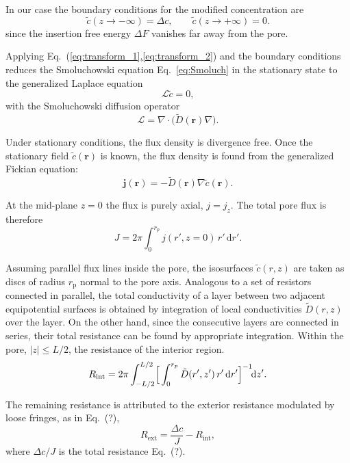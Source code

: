 \documentclass[12pt, a4paper]{article}
\begin{document}
In our case the boundary conditions for the modified concentration are 
\begin{equation*}
  \tilde c(z\to-\infty)=\Delta c,\qquad
  \tilde c(z\to+\infty)=0.
\end{equation*}
since the insertion free energy $\Delta F$ vanishes far away from the pore.

Applying Eq.~(\ref{eq:transform_1},\ref{eq:transform_2}) and the boundary conditions reduces the Smoluchowski equation Eq.~\eqref{eq:Smoluch} in the stationary state to the generalized Laplace equation
\begin{equation}
  \mathcal L\tilde c=0,
  \label{eq:laplace}
\end{equation}
with the Smoluchowski diffusion operator
\begin{equation*}
  \mathcal L=\nabla\!\cdot\!\bigl(\tilde D(\bm r)\nabla\bigr).
\end{equation*}

Under stationary conditions, the flux density is divergence free. 
Once the stationary field $\tilde c(\bm r)$ is known, the flux density is found from the generalized Fickian equation:
\begin{equation}
  \bm j(\bm r)=-\tilde D(\bm r)\nabla\tilde c(\bm r).
\end{equation}

At the mid-plane $z=0$ the flux is purely axial, $j=j_z$. The total pore flux is therefore
\begin{equation}
  J=2\pi\int_{0}^{r_p} j(r',z=0)\,r'\,\mathrm dr'.
\end{equation}

Assuming parallel flux lines inside the pore, the isosurfaces $\tilde c(r,z)$ are taken as  discs of radius $r_{\text{p}}$ normal to the pore axis.
Analogous to a set of resistors connected in parallel, the total conductivity of a layer between two adjacent equipotential surfaces is obtained by integration of local conductivities $\tilde D(r,z)$ over the layer.
On the other hand, since the consecutive layers are connected in series, their total resistance can be found by appropriate integration.
Within the pore, $|z|\leq L/2$, the resistance of the interior region.
\begin{equation}
  R_{\text{int}}
   =2\pi\int_{-L/2}^{L/2}
     \Bigl[\,
       \int_{0}^{r_p}\tilde D(r',z')\,r'\,\mathrm dr'
     \Bigr]^{-1}\!\mathrm dz'.
\end{equation}

The remaining resistance is attributed to the exterior resistance modulated by loose fringes, as in Eq.~(?),
\begin{equation}
  R_{\text{ext}}=\frac{\Delta c}{J}-R_{\text{int}},
\end{equation}
where $\Delta c/J$ is the total resistance Eq.~(?).
\end{document}
